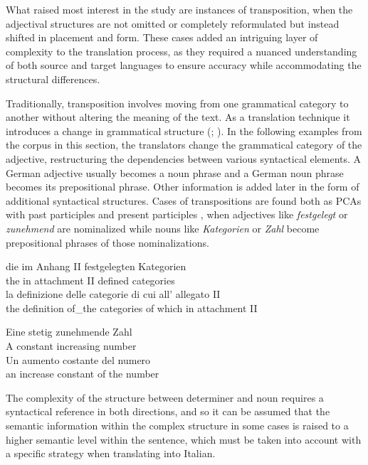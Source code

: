 \documentclass[output=paper,colorlinks,citecolor=brown]{langscibook}
\begin{document}
What raised most interest in the study are instances of transposition, when the adjectival structures are not omitted or completely reformulated but instead shifted in placement and form. These cases added an intriguing layer of complexity to the translation process, as they required a nuanced understanding of both source and target languages to ensure accuracy while accommodating the structural differences.

Traditionally, transposition involves moving from one grammatical category to another without altering the meaning of the text. As a translation technique it introduces a change in grammatical structure (\citealt{AlcarazHughes2002}; \citealt{Kather2011}). In the following examples from the corpus in this section, the translators change the grammatical category of the adjective, restructuring the dependencies between various syntactical elements. A German adjective usually becomes a noun phrase and a German noun phrase becomes its prepositional phrase. Other information is added later in the form of additional syntactical structures. Cases of transpositions are found both as PCAs with past participles  and present participles , when adjectives like \textit{festgelegt} or \textit{zunehmend} are nominalized while nouns like \textit{Kategorien} or \textit{Zahl} become prepositional phrases of those nominalizations.

\ea%
    \label{ex:resi:55}
    \ea
\gll  die  im  Anhang  II  festgelegten  Kategorien \\
     the  in  attachment  II  defined  categories\\
\ex
\gll  la  definizione  delle  categorie  di cui all’  allegato  II\\
  the  definition  of\_the  categories    of which in   attachment  II\\
\z
\z

\ea%
    \label{ex:resi:56}
\ea
\gll  Eine  stetig  zunehmende  Zahl \\
   A  constant  increasing  number  \\
\ex
\gll   Un  aumento  costante  del  numero\\
  an  increase  constant  of the  number\\
\z
\z

The complexity of the structure between determiner and noun requires a syntactical reference in both directions, and so it can be assumed that the semantic information within the complex structure in some cases is raised to a higher semantic level within the sentence, which must be taken into account with a specific strategy when translating into Italian.
\end{document}
